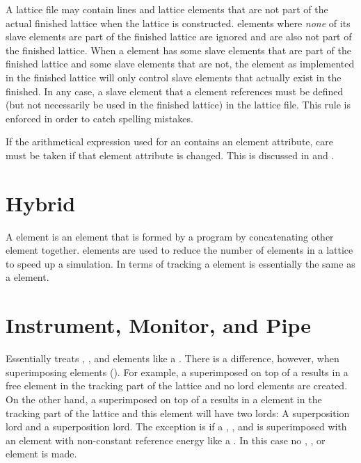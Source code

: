 A lattice file may contain lines and lattice elements that are not part of the actual finished
lattice when the lattice is constructed.  elements where {\em none} of its slave elements
are part of the finished lattice are ignored and are also not part of the finished lattice.  When a
 element has some slave elements that are part of the finished lattice and some slave
elements that are not, the  element as implemented in the finished lattice will only
control slave elements that actually exist in the finished. In any case, a slave element that a
 element references must be defined (but not necessarily be used in the finished lattice)
in the lattice file. This rule is enforced in order to catch spelling mistakes.

If the arithmetical expression used for an  contains an element attribute, care must be
taken if that element attribute is changed. This is discussed in  and
.

\newpage

\section{Hybrid}
\label{s:hybrid}

A  element is an element that is formed by a program by concatenating other element
together.  elements are used to reduce the number of elements in a lattice to speed up a
simulation. In terms of tracking a  element is essentially the same as a 
element.

\newpage

\section{Instrument, Monitor, and Pipe}
\label{s:monitor}

Essentially \bmad treats , , and  elements like a
. There is a difference, however, when superimposing elements (). For
example, a  superimposed on top of a  results in a free 
element in the tracking part of the lattice and no lord elements are created. On the other hand, a
 superimposed on top of a  results in a  element in the
tracking part of the lattice and this  element will have two lords: A 
superposition lord and a  superposition lord. The exception is if a ,
, and  is superimposed with an element with non-constant reference energy like
a . In this case no , , or   element
is made.


